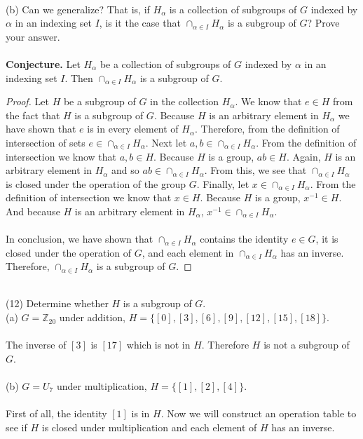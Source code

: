 \documentclass[11pt,a4paper]{article}
\begin{document}
~\\
(b) Can we generalize? That is, if ${H_\alpha}$ is a collection of subgroups of $G$ indexed by $\alpha$ in an indexing set $I$, is it the case that $\cap_{\alpha\in I} H_\alpha$ is a subgroup of $G$? Prove your answer.\\
~\\
{\bf Conjecture.} Let ${H_\alpha}$ be a collection of subgroups of $G$ indexed by $\alpha$ in an indexing set $I$. Then $\cap_{\alpha\in I} H_\alpha$ is a subgroup of $G$.\\
\begin{proof}
Let $H$ be a subgroup of $G$ in the collection $H_\alpha$. We know that $e\in H$ from the fact that $H$ is a subgroup of $G$. Because $H$ is an arbitrary element in $H_\alpha$ we have shown that $e$ is in every element of $H_\alpha$. Therefore, from the definition of intersection of sets $e\in\cap_{\alpha\in I} H_\alpha$. Next let $a,b\in\cap_{\alpha\in I} H_\alpha$. From the definition of intersection we know that $a,b\in H$. Because $H$ is a group, $ab\in H$. Again, $H$ is an arbitrary element in $H_\alpha$ and so $ab\in\cap_{\alpha\in I} H_\alpha$. From this, we see that $\cap_{\alpha\in I} H_\alpha$ is closed under the operation of the group $G$. Finally, let $x\in \cap_{\alpha\in I} H_\alpha$. From the definition of intersection we know that $x\in H$. Because $H$ is a group, $x^{-1}\in H$. And because $H$ is an arbitrary element in $H_\alpha$, $x^{-1}\in\cap_{\alpha\in I} H_\alpha$.\\
~\\
In conclusion, we have shown that $\cap_{\alpha\in I} H_\alpha$ contains the identity $e\in G$, it is closed under the operation of $G$, and each element in $\cap_{\alpha\in I} H_\alpha$ has an inverse. Therefore, $\cap_{\alpha\in I} H_\alpha$ is a subgroup of $G$.
\end{proof}
~\\
(12) Determine whether $H$ is a subgroup of $G$.\\
(a) $G=\mathbb{Z}_{20}$ under addition, $H=\{[0],[3],[6],[9],[12],[15],[18]\}$.\\
~\\
The inverse of $[3]$ is $[17]$ which is not in $H$. Therefore $H$ is not a subgroup of $G$.\\
~\\
(b) $G=U_7$ under multiplication, $H=\{[1],[2],[4]\}$.\\
~\\
First of all, the identity $[1]$ is in $H$. Now we will construct an operation table to see if $H$ is closed under multiplication and each element of $H$ has an inverse.
\end{document}
